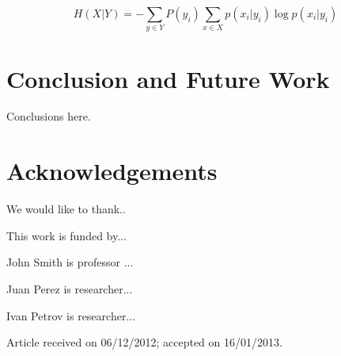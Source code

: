 \documentclass{cys}
\begin{document}
\begin{equation}
H(X|Y) = - \sum_{y \in Y} P(y_i) \sum_{x \in X} p(x_i|y_i)\log p(x_i|y_i)
\label{equation:conditionalEntropy1}
\end{equation}


\section{Conclusion and Future Work}
\label{sec:conclusionAndFutureWork}

Conclusions here.

\section*{Acknowledgements} 
We would like to thank.. 

This work is funded by...


\small{


}
\normalsize


\begin{biography}{John Smith} 
is professor ...
\end{biography}

\begin{biography}{Juan Perez} 
is researcher...
\end{biography}

\begin{biography}{Ivan Petrov} 
is researcher...
\end{biography}


{\vskip 12pt}
\noindent
\footnotesize {Article received on 06/12/2012; accepted on 16/01/2013.}
\end{document}
